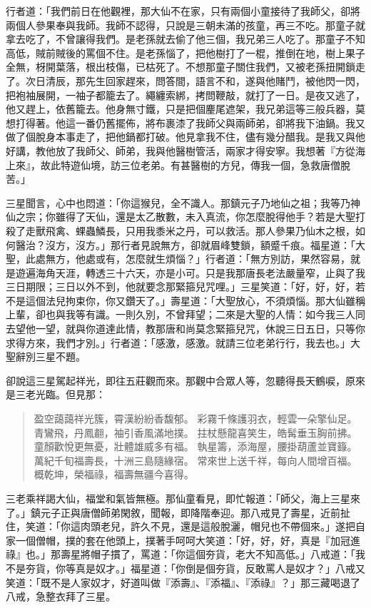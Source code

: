 行者道：「我們前日在他觀裡，那大仙不在家，只有兩個小童接待了我師父，卻將兩個人參果奉與我師。我師不認得，只說是三朝未滿的孩童，再三不吃。那童子就拿去吃了，不曾讓得我們。是老孫就去偷了他三個，我兄弟三人吃了。那童子不知高低，賊前賊後的罵個不住。是老孫惱了，把他樹打了一棍，推倒在地，樹上果子全無，枒開葉落，根出枝傷，已枯死了。不想那童子關住我們，又被老孫扭開鎖走了。次日清辰，那先生回家趕來，問答間，語言不和，遂與他賭鬥，被他閃一閃，把袍袖展開，一袖子都籠去了。繩纏索綁，拷問鞭敲，就打了一日。是夜又逃了，他又趕上，依舊籠去。他身無寸鐵，只是把個麈尾遮架，我兄弟這等三般兵器，莫想打得著。他這一番仍舊擺佈，將布裹漆了我師父與兩師弟，卻將我下油鍋。我又做了個脫身本事走了，把他鍋都打破。他見拿我不住，儘有幾分醋我。是我又與他好講，教他放了我師父、師弟，我與他醫樹管活，兩家才得安寧。我想著『方從海上來』，故此特遊仙境，訪三位老弟。有甚醫樹的方兒，傳我一個，急救唐僧脫苦。」

三星聞言，心中也悶道：「你這猴兒，全不識人。那鎮元子乃地仙之祖；我等乃神仙之宗；你雖得了天仙，還是太乙散數，未入真流，你怎麼脫得他手？若是大聖打殺了走獸飛禽、蜾蟲鱗長，只用我黍米之丹，可以救活。那人參果乃仙木之根，如何醫治？沒方，沒方。」那行者見說無方，卻就眉峰雙鎖，額蹙千痕。福星道：「大聖，此處無方，他處或有，怎麼就生煩惱？」行者道：「無方別訪，果然容易，就是遊遍海角天涯，轉透三十六天，亦是小可。只是我那唐長老法嚴量窄，止與了我三日期限；三日以外不到，他就要念那緊箍兒咒哩。」三星笑道：「好，好，好，若不是這個法兒拘束你，你又鑽天了。」壽星道：「大聖放心，不須煩惱。那大仙雖稱上輩，卻也與我等有識。一則久別，不曾拜望；二來是大聖的人情：如今我三人同去望他一望，就與你道達此情，教那唐和尚莫念緊箍兒咒，休說三日五日，只等你求得方來，我們才別。」行者道：「感激，感激。就請三位老弟行行，我去也。」大聖辭別三星不題。

卻說這三星駕起祥光，即往五莊觀而來。那觀中合眾人等，忽聽得長天鶴唳，原來是三老光臨。但見那：
\begin{quote}
盈空藹藹祥光簇，霄漢紛紛香馥郁。
彩霧千條護羽衣，輕雲一朵擎仙足。
青鸞飛，丹鳳䎘，袖引香風滿地撲。
拄杖懸龍喜笑生，皓髯垂玉胸前拂。
童顏歡悅更無憂，壯體雄威多有福。
執星籌，添海屋，腰掛葫蘆並寶籙。
萬紀千旬福壽長，十洲三島隨緣宿。
常來世上送千祥，每向人間增百福。
概乾坤，榮福祿，福壽無疆今喜得。
\end{quote}

三老乘祥謁大仙，福堂和氣皆無極。那仙童看見，即忙報道：「師父，海上三星來了。」鎮元子正與唐僧師弟閑敘，聞報，即降階奉迎。那八戒見了壽星，近前扯住，笑道：「你這肉頭老兒，許久不見，還是這般脫灑，帽兒也不帶個來。」遂把自家一個僧帽，撲的套在他頭上，撲著手呵呵大笑道：「好，好，好，真是『加冠進祿』也。」那壽星將帽子摜了，罵道：「你這個夯貨，老大不知高低。」八戒道：「我不是夯貨，你等真是奴才。」福星道：「你倒是個夯貨，反敢罵人是奴才？」八戒又笑道：「既不是人家奴才，好道叫做『添壽』、『添福』、『添祿』？」那三藏喝退了八戒，急整衣拜了三星。

